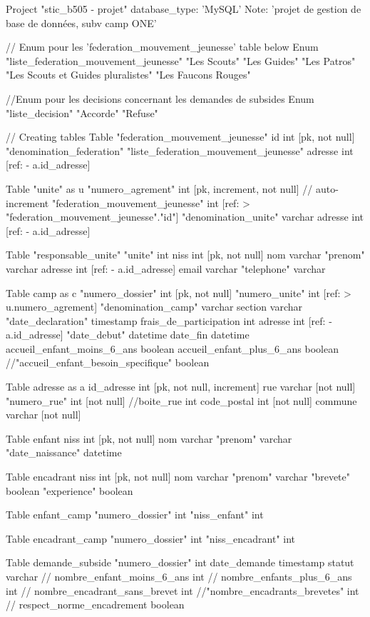 
Project "stic_b505 - projet" {
  database_type: 'MySQL'
  Note: 'projet de gestion de base de données, subv camp ONE'
}

// Enum pour les 'federation_mouvement_jeunesse' table below
Enum "liste_federation_mouvement_jeunesse" {
  "Les Scouts"
  "Les Guides"
  "Les Patros"
  "Les Scouts et Guides pluralistes"
  "Les Faucons Rouges"
}

//Enum pour les decisions concernant les demandes de subsides
Enum "liste_decision"{
  "Accorde"
  "Refuse"
}

// Creating tables
Table "federation_mouvement_jeunesse" {
  id int [pk, not null]
  "denomination_federation" "liste_federation_mouvement_jeunesse"
  adresse int [ref: - a.id_adresse]
}



Table "unite" as u {
  "numero_agrement" int [pk, increment, not null] // auto-increment
  "federation_mouvement_jeunesse" int [ref: > "federation_mouvement_jeunesse"."id"]
  "denomination_unite" varchar
  adresse int [ref: - a.id_adresse]
}

Table "responsable_unite" {
  "unite" int
  niss int [pk, not null]
  nom varchar
  "prenom" varchar
  adresse int [ref: - a.id_adresse]
  email varchar
  "telephone" varchar
}

Table camp as c {
  "numero_dossier" int [pk, not null]
  "numero_unite" int [ref: > u.numero_agrement]
  "denomination_camp" varchar
  section varchar
  "date_declaration" timestamp
  frais_de_participation int
  adresse int [ref: - a.id_adresse]
  "date_debut" datetime
  date_fin datetime
  accueil_enfant_moins_6_ans boolean
  accueil_enfant_plus_6_ans boolean
  //"accueil_enfant_besoin_specifique" boolean
}


Table adresse as a {
  id_adresse int [pk, not null, increment]
  rue varchar [not null]
  "numero_rue" int [not null]
  //boite_rue int
  code_postal int [not null]
  commune varchar [not null]
  }


Table enfant {
  niss int [pk,  not null]
  nom varchar
  "prenom" varchar
  "date_naissance" datetime
}

Table encadrant {
  niss int [pk, not null]
  nom varchar
  "prenom" varchar
  "brevete" boolean
  "experience" boolean
}


Table enfant_camp {
  "numero_dossier" int
  "niss_enfant" int
}

Table encadrant_camp {
  "numero_dossier" int
  "niss_encadrant" int
}


Table demande_subside {
  "numero_dossier" int 
  date_demande timestamp
  statut varchar
 // nombre_enfant_moins_6_ans int
 // nombre_enfants_plus_6_ans int
 // nombre_encadrant_sans_brevet int
 //"nombre_encadrants_brevetes" int
 // respect_norme_encadrement boolean
}



